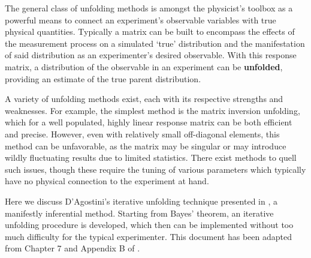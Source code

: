 The general class of unfolding methods is amongst the physicist's toolbox as a powerful 
means to connect an experiment's observable variables with true physical quantities.
Typically a matrix can be built to encompass the effects of the measurement process
on a simulated `true' distribution and the manifestation of said distribution as an 
experimenter's desired observable. With this response matrix, a distribution of 
the observable in an experiment can be \textbf{unfolded}, providing an estimate of the 
true parent distribution.

A variety of unfolding methods exist, each with its respective strengths and weaknesses.
For example, the simplest method is the matrix inversion unfolding, which for a well 
populated, highly linear response matrix can be both efficient and precise.
However, even with relatively small off-diagonal elements, this method can be unfavorable,
as the matrix may be singular or may introduce wildly fluctuating results due to limited 
statistics. There exist methods to quell such issues, though these require the tuning
of various parameters which typically have no physical connection to the experiment at hand.

Here we discuss D'Agostini's iterative unfolding technique presented in \cite{agostini}, 
a manifestly inferential method.
Starting from Bayes' theorem, an iterative unfolding procedure is developed, 
which then can be implemented without too much difficulty for the typical experimenter.
This document has been adapted from Chapter 7 and Appendix B of \cite{zhampel-thesis}.
